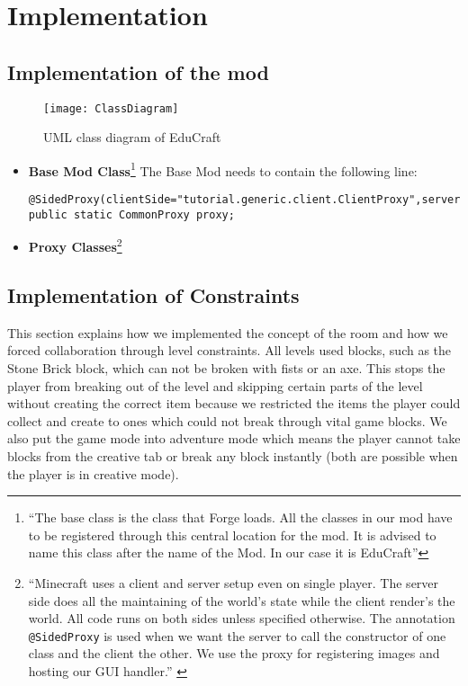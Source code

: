 \chapter{Implementation}
\label{ch:implementation}

\section{Implementation of the mod}

\begin{figure}[H]
\label{fig:class-diagram}
\caption{UML class diagram of EduCraft}
\centering
\texttt{[image: ClassDiagram]}
\end{figure}

\begin{itemize}
\item \textbf{Base Mod Class}\footnote{``The base class is the class that Forge loads. All the classes in our mod have to be registered through this central location for the mod. It is advised to name this class after the name of the Mod. In our case it is EduCraft''\cite{website:forge-basemods}}\newline
The Base Mod needs to contain the following line:
\begin{lstlisting}
@SidedProxy(clientSide="tutorial.generic.client.ClientProxy",serverSide="tutorial.generic.CommonProxy")
public static CommonProxy proxy;
\end{lstlisting}

\item \textbf{Proxy Classes}\footnote{``Minecraft uses a client and server setup even on single player. The server side does all the maintaining of the world’s state while the client render’s the world. All code runs on both sides unless specified otherwise.\newline
The annotation \texttt{@SidedProxy} is used when we want the server to call the constructor of one class and the client the other. We use the proxy for registering images and hosting our GUI handler.'' \cite{website:forge-proxy}}
\end{itemize}

\section{Implementation of Constraints}
This section explains how we implemented the concept of the room and how we forced collaboration through level constraints. All levels used blocks, such as the Stone Brick block, which can not be broken with fists or an axe. This stops the player from breaking out of the level and skipping certain parts of the level without creating the correct item because we restricted the items the player could collect and create to ones which could not break through vital game blocks. We also put the game mode into adventure mode which means the player cannot take blocks from the creative tab or break any block instantly (both are possible when the player is in creative mode).

